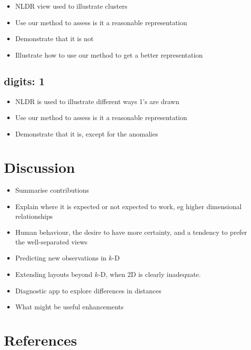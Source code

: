 \documentclass[
  12pt]{article}
\providecommand{\tightlist}{%
  \setlength{\itemsep}{0pt}\setlength{\parskip}{0pt}}\usepackage{longtable,booktabs,array}
\def\tightlist{}
\begin{document}
\begin{itemize}
\tightlist
\item
  NLDR view used to illustrate clusters
\item
  Use our method to assess is it a reasonable representation
\item
  Demonstrate that it is not
\item
  Illustrate how to use our method to get a better representation
\end{itemize}

\subsection{digits: 1}\label{digits-1}

\begin{itemize}
\tightlist
\item
  NLDR is used to illustrate different ways 1's are drawn
\item
  Use our method to assess is it a reasonable representation
\item
  Demonstrate that it is, except for the anomalies
\end{itemize}

\section{Discussion}\label{sec-discussion}

\begin{itemize}
\tightlist
\item
  Summarise contributions
\item
  Explain where it is expected or not expected to work, eg higher
  dimensional relationships
\item
  Human behaviour, the desire to have more certainty, and a tendency to
  prefer the well-separated views
\item
  Predicting new observations in \(k\)-D
\item
  Extending layouts beyond \(k\)-D, when 2D is clearly inadequate.
\item
  Diagnostic app to explore differences in distances
\item
  What might be useful enhancements
\end{itemize}

\section*{References}\label{references}

\renewcommand{\bibsection}{}


\newpage{}
\end{document}
